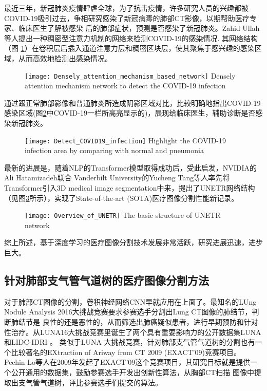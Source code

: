 	最近三年，新冠肺炎疫情肆虐全球，为了抗击疫情，许多研究人员的兴趣都被COVID-19吸引过去，争相研究感染了新冠病毒的肺部CT影像，以期帮助医疗专家、临床医生了解被感染
	后的肺部症状，预测是否感染了新冠肺炎。Zahid Ullah等人\cite{Ullah2023DenselyAM}提出一种稠密型注意力机制的网络来检测COVID-19的感染情况. 其网络结构（图
	\ref{fig:COVID19}）在卷积层后插入通道注意力层和稠密区块层，使其聚焦于感兴趣的感染区域，从而高效地检测出感染情况。
	\begin{figure}[htp]
		\centering
		\texttt{[image: Densely\_attention\_mechanism\_based\_network]}
			{Densely attention mechanism network to detect the COVID-19 infection}
		\label{fig:COVID19}
	\end{figure}
	通过跟正常肺部影像和普通肺炎所造成阴影区域对比，比较明确地指出COVID-19感染区域(图\ref{fig:COVID19_detection}中COVID-19一栏所高亮显示的)，展现给临床医生，辅助诊断是否感染新冠肺炎。
	\begin{figure}[ht]
		\centering
		\texttt{[image: Detect\_COVID19\_infection]}
			{Highlight the COVID-19 infection area by comparing with normal and pneumonia}
		\label{fig:COVID19_detection}
	\end{figure}
	
	最新的进展是，随着NLP的Transformer模型\cite{Devlin2019BERTPO, NIPS2017Attention}取得成功后，受此启发，NVIDIA的Ali Hatamizadeh联合
	Vanderbilt University的Yucheng Tang等人\cite{unetr}率先将Transformer引入3D medical image segmentation中来，提出了UNETR网络结构
	（见图\ref{fig:UNETR}所示），实现了State-of-the-art (SOTA)医疗图像分割性能新记录。
	\begin{figure}[hbp]
		\centering
		\texttt{[image: Overview\_of\_UNETR]}
			{The basic structure of UNETR network}
		\label{fig:UNETR}
	\end{figure}
	
	综上所述，基于深度学习的医疗图像分割技术发展非常活跃，研究进展迅速，进步巨大。
	
	
	
	\subsection{针对肺部支气管气道树的医疗图像分割方法}
	对于肺部CT图像的分割，卷积神经网络CNN早就应用在上面了。最知名的LUng Nodule Analysis 2016大挑战竞赛要求参赛选手分割出Lung CT图像的肺结节，判断肺结节是
	良性的还是恶性的，从而筛选出肺癌疑似患者，进行早期预防和针对性治疗。从LUNA16大挑战竞赛里诞生了两个具有重要影响力的公开数据集LUNA和LIDC-IDRI
	\cite{Charles2011LIDC}。 类似于LUNA	大挑战竞赛，针对肺部支气管气道树的分割也有一个比较著名的EXtraction of Ariway from CT 2009 (EXACT'09)竞赛项目。
	Pechin Lo等人\cite{Lo2012ExtractionOA}在2009年发起了EXACT'09这个竞赛项目，其研究目标就是提供一个公开通用的数据集，鼓励参赛选手开发出创新性算法，从胸部CT扫描
	图像中提取出支气管气道树，评比参赛选手们提交的算法。
	
